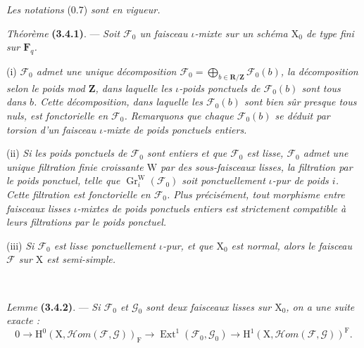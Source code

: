 \documentclass[11pt,leqno]{article}
\newcommand{\Page}[1]{\ifvmode\noindent\else\unskip\ \fi{\footnotesize\textcolor{gray}{[p.\,#1]}}\ \ignorespaces}
\begin{document}
\textit{Les notations} (0.7) \textit{sont en vigueur.}

\textit{Théorème} \textbf{(3.4.1)}. — \textit{Soit \(\mathscr{F}_0\) un faisceau \(\iota\)-mixte sur un schéma \(\mathrm{X}_0\) de type fini sur \(\mathbf{F}_q\).}

(i) \textit{\(\mathscr{F}_0\) admet une unique décomposition \(\mathscr{F}_0=\displaystyle\bigoplus_{b\in\mathbf{R}/\mathbf{Z}}\mathscr{F}_0(b)\), la \textup{décomposition selon le poids mod \(\mathbf{Z}\)}, dans laquelle les \(\iota\)-poids ponctuels de \(\mathscr{F}_0(b)\) sont tous dans \(b\). Cette décomposition, dans laquelle les \(\mathscr{F}_0(b)\) sont bien sûr presque tous nuls, est fonctorielle en \(\mathscr{F}_0\). Remarquons que chaque \(\mathscr{F}_0(b)\) se déduit par torsion d’un faisceau \(\iota\)-mixte de poids ponctuels entiers.}

(ii) \textit{Si les poids ponctuels de \(\mathscr{F}_0\) sont entiers et que \(\mathscr{F}_0\) est lisse, \(\mathscr{F}_0\) admet une unique filtration finie croissante \(\mathrm{W}\) par des sous-faisceaux lisses, la \textup{filtration par le poids ponctuel}, telle que \(\operatorname{Gr}_i^{\mathrm{W}}(\mathscr{F}_0)\) soit ponctuellement \(\iota\)-pur de poids \(i\). Cette filtration est fonctorielle en \(\mathscr{F}_0\). Plus précisément, tout morphisme entre faisceaux lisses \(\iota\)-mixtes de poids ponctuels entiers est strictement compatible à leurs filtrations par le poids ponctuel.}

(iii) \textit{Si \(\mathscr{F}_0\) est lisse ponctuellement \(\iota\)-pur, et que \(\mathrm{X}_0\) est normal, alors le faisceau \(\mathscr{F}\) sur \(\mathrm{X}\) est semi-simple.}

\Page{208}

\textit{Lemme} \textbf{(3.4.2)}. — \textit{Si \(\mathscr{F}_0\) et \(\mathscr{G}_0\) sont deux faisceaux lisses sur \(\mathrm{X}_0\), on a une suite exacte :}
\[
0\to\mathrm{H}^0(\mathrm{X},\mathscr{H}\!om(\mathscr{F},\mathscr{G}))_{\mathrm{F}}
\to\operatorname{Ext}^1(\mathscr{F}_0,\mathscr{G}_0)
\to\mathrm{H}^1(\mathrm{X},\mathscr{H}\!om(\mathscr{F},\mathscr{G}))^{\mathrm{F}}.
\]
\end{document}
